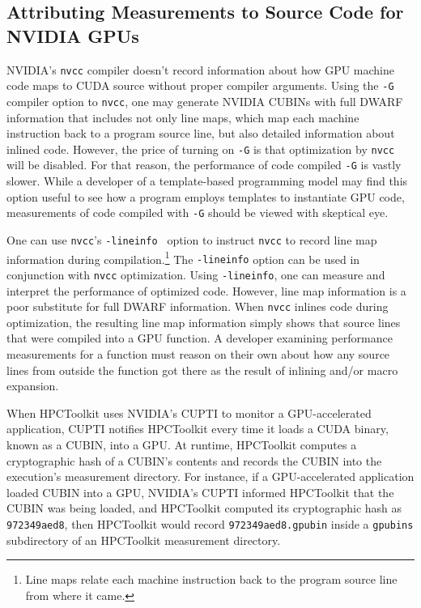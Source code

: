 \subsection{Attributing Measurements to Source Code for NVIDIA GPUs}

NVIDIA's {\tt nvcc} compiler doesn't record information about how GPU machine code maps to CUDA source without proper compiler arguments. Using the {\tt -G} compiler option to {\tt nvcc}, one may generate NVIDIA CUBINs with full DWARF information that includes not only line maps, which map each machine instruction back to a program source line, but also detailed information about inlined code. However, the price of turning on {\tt -G} is that optimization by {\tt nvcc} will be disabled. For that reason, the performance of code compiled {\tt -G} is vastly slower. While a developer of a template-based programming model may find this option useful to see how a program employs templates to instantiate GPU code, measurements of code compiled with {\tt -G} should be viewed with skeptical eye.

One can use {\tt nvcc}'s {\tt -lineinfo } option to instruct {\tt nvcc} to record line map information during compilation.\footnote{Line maps relate each machine instruction back to the program source line from where it came.} The {\tt -lineinfo} option can be used in conjunction with {\tt nvcc} optimization. Using {\tt -lineinfo}, one can measure and interpret the performance of optimized code. However, line map information is a poor substitute for full DWARF information. When {\tt nvcc} inlines code during optimization, the resulting line map information simply shows that source lines that were compiled into a GPU function. A developer examining performance measurements for a function must reason on their own about how any source lines from outside the function got there as the result of inlining and/or macro expansion.

When HPCToolkit uses NVIDIA's CUPTI to monitor a GPU-accelerated application, 
CUPTI notifies HPCToolkit every time it loads a CUDA binary, known as a CUBIN, into a GPU.
At runtime, HPCToolkit computes a cryptographic hash of a CUBIN's contents and records the CUBIN into the execution's measurement directory. 
For instance, if a GPU-accelerated application loaded CUBIN into a GPU, NVIDIA's CUPTI informed HPCToolkit that the CUBIN was being loaded, and HPCToolkit computed its cryptographic hash as {\tt 972349aed8}, then HPCToolkit would record {\tt 972349aed8.gpubin} inside a {\tt gpubins} subdirectory of an HPCToolkit measurement directory.

